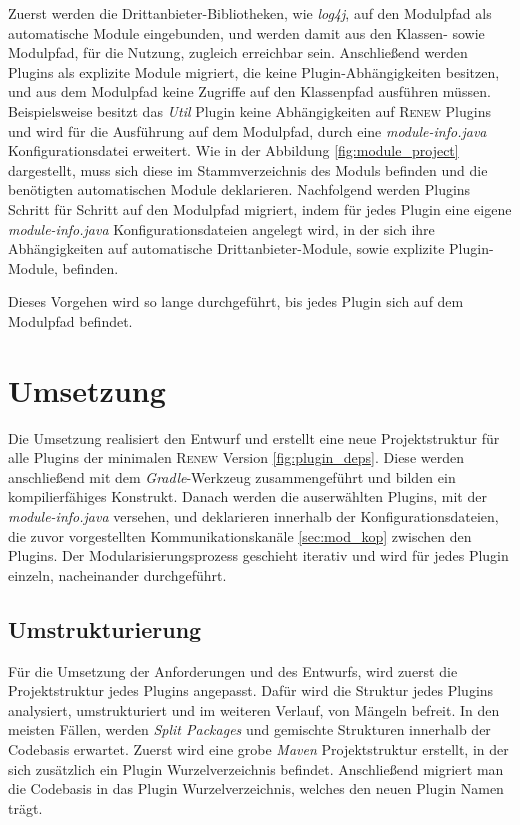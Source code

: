 	Zuerst werden die Drittanbieter-Bibliotheken, wie \textit{log4j}, auf den Modulpfad als automatische Module eingebunden, und werden damit aus den Klassen- sowie Modulpfad, für die Nutzung, zugleich erreichbar sein. Anschließend werden Plugins als explizite Module migriert, die keine Plugin-Abhängigkeiten besitzen, und aus dem Modulpfad keine Zugriffe auf den Klassenpfad ausführen müssen. Beispielsweise besitzt das \textit{Util} Plugin keine Abhängigkeiten auf \textsc{Renew} Plugins und wird für die Ausführung auf dem Modulpfad, durch eine \textit{module-info.java} Konfigurationsdatei erweitert. Wie in der Abbildung \ref{fig:module_project} dargestellt, muss sich diese im Stammverzeichnis des Moduls befinden und die benötigten automatischen Module deklarieren.\newline
	Nachfolgend werden Plugins Schritt für Schritt auf den Modulpfad migriert, indem für jedes Plugin eine eigene \textit{module-info.java} Konfigurationsdateien angelegt wird, in der sich ihre Abhängigkeiten auf automatische Drittanbieter-Module, sowie explizite Plugin-Module, befinden.\bigbreak

	Dieses Vorgehen wird so lange durchgeführt, bis jedes Plugin sich auf dem Modulpfad befindet. 

\section{Umsetzung}

	Die Umsetzung realisiert den Entwurf und erstellt eine neue Projektstruktur für alle Plugins der minimalen \textsc{Renew} Version \ref{fig:plugin_deps}. Diese werden anschließend mit dem \textit{Gradle}-Werkzeug zusammengeführt und bilden ein kompilierfähiges Konstrukt. Danach werden die auserwählten Plugins, mit der \textit{module-info.java} versehen, und deklarieren innerhalb der Konfigurationsdateien, die zuvor vorgestellten Kommunikationskanäle \ref{sec:mod_kop} zwischen den Plugins.\newline
	Der Modularisierungsprozess geschieht iterativ und wird für jedes Plugin einzeln, nacheinander durchgeführt.
\newpage
\subsection{Umstrukturierung}

	Für die Umsetzung der Anforderungen und des Entwurfs, wird zuerst die Projektstruktur jedes Plugins angepasst. Dafür wird die Struktur jedes Plugins analysiert, umstrukturiert und im weiteren Verlauf, von Mängeln befreit. In den meisten Fällen, werden \textit{Split Packages} und gemischte Strukturen innerhalb der Codebasis erwartet.\bigbreak
	Zuerst wird eine grobe \textit{Maven} Projektstruktur erstellt, in der sich zusätzlich ein Plugin Wurzelverzeichnis befindet. Anschließend migriert man die Codebasis in das Plugin Wurzelverzeichnis, welches den neuen Plugin Namen trägt.

